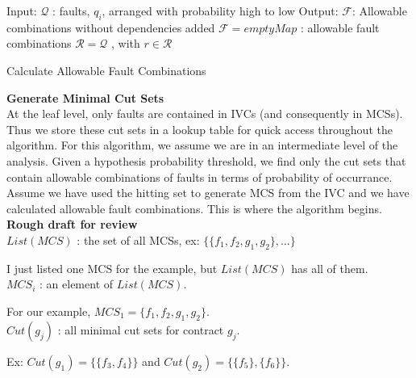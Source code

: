 \begin{algorithm}[H]
	Input: $\mathcal{Q}$ : faults, $q_i$, arranged with probability high to low \;
	Output: $\mathcal{F}$: Allowable combinations without dependencies added  \;
	$\mathcal{F} = emptyMap$ : allowable fault combinations  \;
	$\mathcal{R} = \mathcal{Q}$ , with $r \in \mathcal{R}$\;
	\caption{Calculate Allowable Fault Combinations}
\end{algorithm}



\textbf{Generate Minimal Cut Sets}\\

At the leaf level, only faults are contained in IVCs (and consequently in MCSs). Thus we store these cut sets in a lookup table for quick access throughout the algorithm. For this algorithm, we assume we are in an intermediate level of the analysis. Given a hypothesis probability threshold, we find only the cut sets that contain allowable combinations of faults in terms of probability of occurrance.\\

Assume we have used the hitting set to generate MCS from the IVC and we have calculated allowable fault combinations. This is where the algorithm begins. \\

\textbf{Rough draft for review}\\

$List(MCS)$ : the set of all MCSs, ex: $\{\{f_1,f_2,g_1,g_2\}, ...\}$ 

I just listed one MCS for the example, but $List(MCS)$ has all of them. \\

$MCS_i$ : an element of $List(MCS)$. 

For our example, $MCS_1 = \{f_1,f_2,g_1,g_2\}$.\\

$Cut(g_j)$ : all minimal cut sets for contract $g_j$. 

Ex: $Cut(g_1) = \{\{f_3,f_4\}\}$ and $Cut(g_2) = \{\{f_5\}, \{f_6\}\}$.    \\

